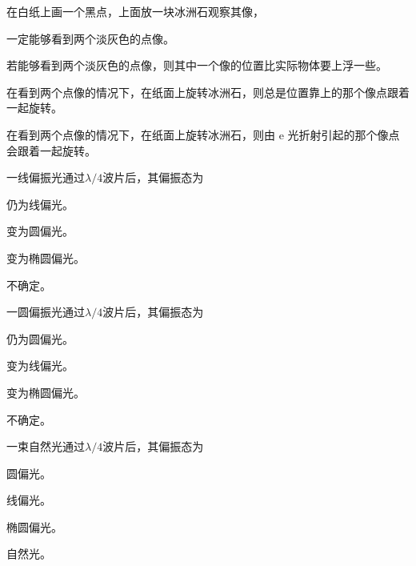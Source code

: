\documentclass[padl, analysis, notocnum]{ExBook}
\newcommand{\answerarea}[1][3.5cm]{%
  \par\vspace{1mm}%
  \noindent{\color{themeColor!35}\rule{\linewidth}{0.4pt}}\par
  \noindent\begin{minipage}[t][#1][t]{\linewidth}\vspace{0pt}\end{minipage}\par
  \noindent{\color{themeColor!35}\rule{\linewidth}{0.4pt}}\par
}
\begin{document}
\begin{qitems}[startnum=2]
\qitem 在白纸上画一个黑点，上面放一块冰洲石观察其像，
\par\noindent\hspace{2em}一定能够看到两个淡灰色的点像。
\par\noindent\hspace{2em}若能够看到两个淡灰色的点像，则其中一个像的位置比实际物体要上浮一些。
\par\noindent\hspace{2em}在看到两个点像的情况下，在纸面上旋转冰洲石，则总是位置靠上的那个像点跟着一起旋转。
\par\noindent\hspace{2em}在看到两个点像的情况下，在纸面上旋转冰洲石，则由 e 光折射引起的那个像点会跟着一起旋转。
\label{q:301:start}
\answerarea[4.0cm]
\label{q:301:end}
\end{qitems}

\begin{qitems}[startnum=3]
\qitem 一线偏振光通过$\lambda /4$波片后，其偏振态为
\par\noindent\hspace{2em}仍为线偏光。
\par\noindent\hspace{2em}变为圆偏光。
\par\noindent\hspace{2em}变为椭圆偏光。
\par\noindent\hspace{2em}不确定。
\label{q:302:start}
\answerarea[4.0cm]
\label{q:302:end}
\end{qitems}

\begin{qitems}[startnum=4]
\qitem 一圆偏振光通过$\lambda /4$波片后，其偏振态为
\par\noindent\hspace{2em}仍为圆偏光。
\par\noindent\hspace{2em}变为线偏光。
\par\noindent\hspace{2em}变为椭圆偏光。
\par\noindent\hspace{2em}不确定。
\label{q:303:start}
\answerarea[4.0cm]
\label{q:303:end}
\end{qitems}

\begin{qitems}[startnum=5]
\qitem 一束自然光通过$\lambda /4$波片后，其偏振态为
\par\noindent\hspace{2em}圆偏光。
\par\noindent\hspace{2em}线偏光。
\par\noindent\hspace{2em}椭圆偏光。
\par\noindent\hspace{2em}自然光。
\label{q:304:start}
\answerarea[4.0cm]
\label{q:304:end}
\end{qitems}
\end{document}
